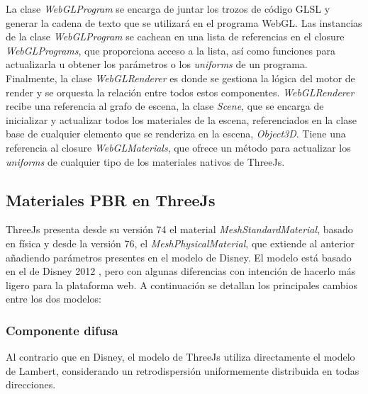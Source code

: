 La clase \textit{WebGLProgram} se encarga de juntar los trozos de c\'odigo GLSL y generar la cadena de texto que se utilizar\'a en
el programa WebGL. Las instancias de la clase \textit{WebGLProgram} se cachean en una lista de referencias en el closure \textit{WebGLPrograms}, que proporciona
acceso a la lista, as\'i como funciones para actualizarla u obtener los par\'ametros o los \textit{uniforms} de un programa. \\

Finalmente, la clase \textit{WebGLRenderer} es donde se gestiona la l\'ogica del motor de render y se orquesta la relaci\'on entre todos
estos componentes. \textit{WebGLRenderer} recibe una referencia al grafo de escena, la clase \textit{Scene}, que se encarga de inicializar
y actualizar todos los materiales de la escena, referenciados en la clase base de cualquier elemento que se renderiza en la escena, \textit{Object3D}.
Tiene una referencia al closure \textit{WebGLMaterials}, que ofrece un m\'etodo para actualizar los \textit{uniforms} de cualquier tipo
de los materiales nativos de ThreeJs.





\subsection{Materiales PBR en ThreeJs}
ThreeJs presenta desde su versi\'on 74 el material \textit{MeshStandardMaterial}, basado en f\'isica y desde la versi\'on
76, el \textit{MeshPhysicalMaterial}, que extiende al anterior a\~nadiendo par\'ametros presentes en el modelo de Disney.
El modelo est\'a basado en el de Disney 2012 \autocite{disney12}, pero con algunas diferencias con intenci\'on de hacerlo m\'as ligero
para la plataforma web. A continuaci\'on se detallan los principales cambios entre los dos modelos:

  \subsubsection{Componente difusa}
  Al contrario que en Disney, el modelo de ThreeJs utiliza directamente el modelo de Lambert, considerando un retrodispersi\'on
  uniformemente distribuida en todas direcciones.\\

